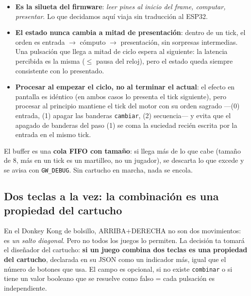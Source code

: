 \begin{itemize}
	\item \textbf{Es la silueta del firmware}: \emph{leer pines al inicio del frame,
		computar, presentar}. Lo que decidamos aquí viaja sin traducción al ESP32.
	
	\item \textbf{El estado nunca cambia a mitad de presentación}: dentro de un tick, el
	orden es entrada $\rightarrow$ cómputo $\rightarrow$ presentación, sin sorpresas
	intermedias. Una pulsación que llega a mitad de ciclo espera al siguiente: la latencia
	percibida es la misma ($\leq$ pausa del reloj), pero el estado queda siempre
	consistente con lo presentado.
	
	\item \textbf{Procesar al empezar el ciclo, no al terminar el actual}: el efecto en
	pantalla es idéntico (en ambos casos lo presenta el tick siguiente), pero procesar al
	principio mantiene el tick del motor con su orden sagrado ---(0) entrada, (1) apagar las
	banderas \texttt{cambiar}, (2) secuencia--- y evita que el apagado de banderas del paso (1)
	se coma la suciedad recién escrita por la entrada en el mismo tick.
\end{itemize}

El buffer es una \textbf{cola FIFO con tamaño}: si llega más de lo que cabe (tamaño de 8, más en un tick es un martilleo, no un jugador), se descarta lo que excede y se avisa con
\texttt{GW\_DEBUG}. Sin cartucho en marcha, nada se encola.

\subsection{Dos teclas a la vez: la combinación es una propiedad del cartucho}
\label{subsec:CombinarTeclas}

En el Donkey Kong de bolsillo, ARRIBA+DERECHA no son dos movimientos: es
\emph{un salto diagonal}. Pero no todos los juegos lo permiten. La decisión ta tomará el 
diseñador del cartucho: \textbf{si un juego combina dos teclas es una propiedad del cartucho},
declarada en su JSON como un indicador más, igual que el número de botones que usa. El campo es opcional, si no existe \texttt{combinar} o si tiene un valor booleano que se resuelve como falso = cada pulsación es independiente.

